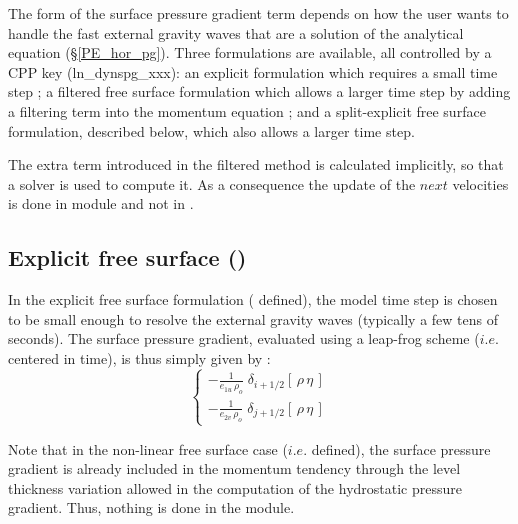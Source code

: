 

The form of the surface pressure gradient term depends on how the user wants to handle 
the fast external gravity waves that are a solution of the analytical equation (\S\ref{PE_hor_pg}). 
Three formulations are available, all controlled by a CPP key (ln\_dynspg\_xxx):
an explicit formulation which requires a small time step ;
a filtered free surface formulation which allows a larger time step by adding a filtering 
term into the momentum equation ; 
and a split-explicit free surface formulation, described below, which also allows a larger time step.

The extra term introduced in the filtered method is calculated 
implicitly, so that a solver is used to compute it. As a consequence the update of the $next$ 
velocities is done in module  and not in .



\subsection{Explicit free surface ()}
\label{DYN_spg_exp}

In the explicit free surface formulation ( defined), the model time step 
is chosen to be small enough to resolve the external gravity waves (typically a few tens of seconds). 
The surface pressure gradient, evaluated using a leap-frog scheme ($i.e.$ centered in time),
is thus simply given by :
\begin{equation} \label{Eq_dynspg_exp}
\left\{ \begin{aligned}
 - \frac{1}{e_{1u}\,\rho_o} \;	\delta _{i+1/2} \left[  \,\rho \,\eta\,  \right] 	\\
 - \frac{1}{e_{2v}\,\rho_o} \;	\delta _{j+1/2} \left[  \,\rho \,\eta\,  \right]  
\end{aligned} \right.
\end{equation} 

Note that in the non-linear free surface case ($i.e.$  defined), the surface pressure 
gradient is already included in the momentum tendency  through the level thickness variation 
allowed in the computation of the hydrostatic pressure gradient. Thus, nothing is done in the  module.


